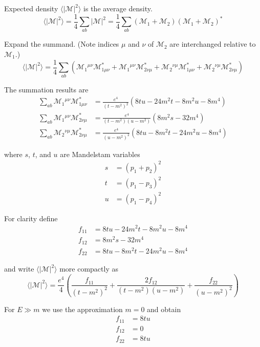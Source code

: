 Expected density $\langle|\mathcal M|^2\rangle$ is the average density.
\begin{equation*}
\langle|\mathcal M|^2\rangle
=\frac{1}{4}\sum_{ab}|\mathcal M|^2
=\frac{1}{4}\sum_{ab}(\mathcal M_1+\mathcal M_2)(\mathcal M_1+\mathcal M_2)^*
\end{equation*}

Expand the summand.
(Note indices $\mu$ and $\nu$ of $\mathcal M_2$ are interchanged relative to $\mathcal M_1$.)
\begin{equation*}
\langle|\mathcal{M}|^2\rangle
=\frac{1}{4}\sum_{ab}
\left(
\mathcal M_{1}{}^{\mu\nu}\mathcal M^*_{1\mu\nu}
+\mathcal M_{1}{}^{\mu\nu}\mathcal M^*_{2\nu\mu}
+\mathcal M_{2}{}^{\nu\mu}\mathcal M^*_{1\mu\nu}
+\mathcal M_{2}{}^{\nu\mu}\mathcal M^*_{2\nu\mu}
\right)
\end{equation*}

The summation results are
\begin{align*}
\sum_{ab}\mathcal M_1{}^{\mu\nu}\mathcal M^*_{1\mu\nu}
&=\frac{e^4}{(t-m^2)^2}
\left(8 t u - 24 m^2 t - 8 m^2 u - 8 m^4\right)
\\
\sum_{ab}\mathcal M_1{}^{\mu\nu}\mathcal M^*_{2\nu\mu}
&=\frac{e^4}{(t-m^2)(u-m^2)}
\left(8 m^2 s - 32 m^4\right)
\\
\sum_{ab}\mathcal M_2{}^{\nu\mu}\mathcal M^*_{2\nu\mu}
&=\frac{e^4}{(u-m^2)^2}
\left(8 t u - 8 m^2 t - 24 m^2 u - 8 m^4\right)
\end{align*}

where $s$, $t$, and $u$ are Mandelstam variables
\begin{align*}
s&=(p_1+p_2)^2
\\
t&=(p_1-p_3)^2
\\
u&=(p_1-p_4)^2
\end{align*}

For clarity define
\begin{align*}
f_{11}&=8 t u - 24 m^2 t - 8 m^2 u - 8 m^4
\\
f_{12}&=8 m^2 s - 32 m^4
\\
f_{22}&=8 t u - 8 m^2 t - 24 m^2 u - 8 m^4
\end{align*}

and write $\langle|\mathcal{M}|^2\rangle$ more compactly as
\begin{equation*}
\langle|\mathcal{M}|^2\rangle=\frac{e^4}{4}
\left(
\frac{f_{11}}{(t-m^2)^2}+\frac{2f_{12}}{(t-m^2)(u-m^2)}+\frac{f_{22}}{(u-m^2)^2}
\right)
\end{equation*}

For $E\gg m$ we use the approximation $m=0$ and obtain
\begin{align*}
f_{11}&=8tu
\\
f_{12}&=0
\\
f_{22}&=8tu
\end{align*}

